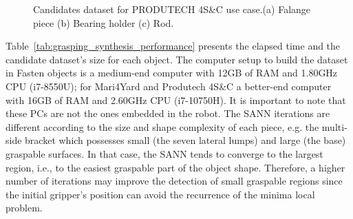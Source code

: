 \begin{figure}[h!]
{\begin{tcolorbox}
\begin{subfigure}[c]{.125\textwidth}
          \caption{}
          \label{fig:rod_candidates}
      \end{subfigure}
     \end{tcolorbox}
     \caption{Candidates dataset for PRODUTECH 4S\&C use case.(a) Falange piece (b) Bearing holder (c) Rod.}
     \label{fig:obj_candiudates_produtech}
   }%
 \end{figure}

Table~\ref{tab:grasping_synthesis_performance} presents the elapsed time and the candidate dataset's size for each object. The computer setup to build the dataset in Fasten objects is a medium-end computer with 12GB of RAM and 1.80GHz CPU (i7-8550U); for Mari4Yard and Produtech 4S\&C a better-end computer with 16GB of RAM and 2.60GHz CPU (i7-10750H). It is important to note that these PCs are not the ones embedded in the robot. The \ac{SANN} iterations are different according to the size and shape complexity of each piece, e.g. the multi-side bracket which possesses small (the seven lateral lumps) and large (the base) graspable surfaces. In that case, the \ac{SANN} tends to converge to the largest region, i.e., to the easiest graspable part of the object shape. Therefore, a higher number of iterations may improve the detection of small graspable regions since the initial gripper's position can avoid the recurrence of the minima local problem.

